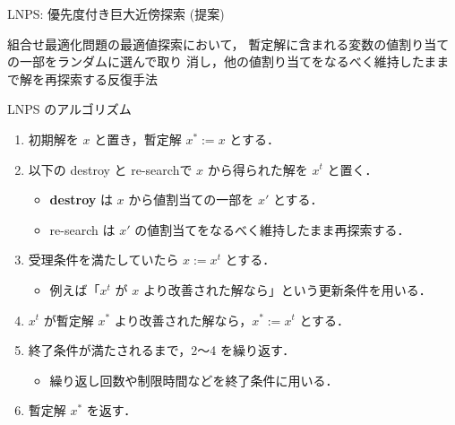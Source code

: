 \documentclass[11pt,dvipdfmx]{beamer}
\begin{document}
\begin{frame}{LNPS: 優先度付き巨大近傍探索 (提案)}
  \begin{alertblock}{}\centering
    組合せ最適化問題の最適値探索において，
    暫定解に含まれる変数の値割り当ての一部をランダムに選んで取り
    消し，他の値割り当てをなるべく維持したままで解を再探索する反復手法
  \end{alertblock}
  \pause
  \begin{block}{\small LNPS のアルゴリズム}
    \begin{enumerate}
      \compress
      \item 初期解を $x$ と置き，暫定解 $x^{*} := x$ とする．
      \item 以下の destroy と re-searchで $x$ から得られた解を $x^{t}$ と置く．
      \begin{itemize}
        \compress
        \item \alert{\bf destroy} は $x$ から値割当ての一部を $x'$ とする．
        \item re-search は $x'$ の値割当てをなるべく維持したまま再探索する．
      \end{itemize}
      \item 受理条件を満たしていたら $x := x^{t}$ とする．
      \begin{itemize}
        \item 例えば「$x^{t}$ が $x$ より改善された解なら」という更新条件を用いる．
      \end{itemize}
      \item $x^{t}$ が暫定解 $x^{*}$ より改善された解なら，$x^{*} := x^{t}$ とする．
      \item 終了条件が満たされるまで，2〜4 を繰り返す．
      \begin{itemize}
        \item 繰り返し回数や制限時間などを終了条件に用いる．
      \end{itemize}
      \item 暫定解 $x^{*}$ を返す．
    \end{enumerate}
  \end{block}
\end{frame}
\end{document}
